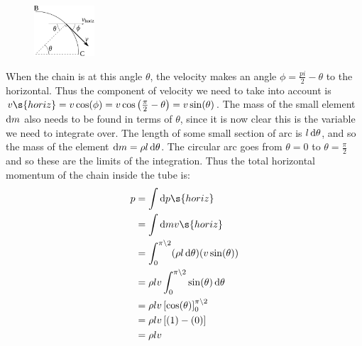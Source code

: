 \begin{problem}
{\begin{enumerate}
\begin{figure}[h]
\centering
\includegraphics[width=0.2\textwidth]{../../../figures/Dynamics_chain_velocity.svg}
\caption{}
\label{fig:Dynamics_chain_velocity}
\end{figure}

When the chain is at this angle $\theta$, the velocity makes an angle $\phi = \frac{pi}{2} - \theta$ to the horizontal. Thus the component of velocity we need to take into account is $v\s{horiz} = v \cos(\phi) = v \cos\left(\frac{\pi}{2} - \theta\right) = v \sin(\theta)$. The mass of the small element $\operatorname{d}\! m$ also needs to be found in terms of $\theta$, since it is now clear this is the variable we need to integrate over. The length of some small section of arc is $l \operatorname{d}\! \theta$, and so the mass of the element $\operatorname{d}\! m = \rho l \operatorname{d}\!\theta$. The circular arc goes from $\theta = 0$ to $\theta =  \frac{\pi}{2}$ and so these are the limits of the integration. Thus the total horizontal momentum of the chain inside the tube is:
\begin{align*} p &= \int \d p\s{horiz} \\ &= \int \d m v\s{horiz} \\ &= \int_{0}^{\pi\backslash 2} (\rho l \d\theta)(v \sin(\theta)) \\ &= \rho l v \int_{0}^{\pi \backslash 2} \sin(\theta) \d\theta \\ &= \rho l v \left[ \cos(\theta)\right]_{0}^{\pi \backslash 2} \\ &= \rho l v \left[ (1) - (0) \right] \\ &= \rho l v \end{align*}



\end{enumerate}}
\end{problem}
